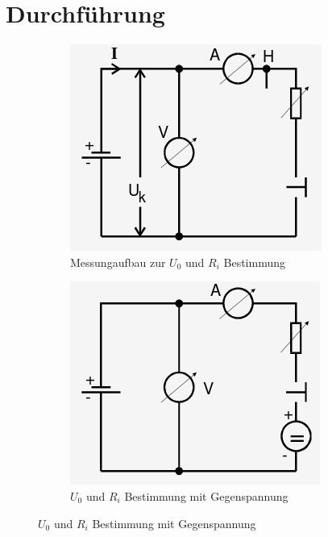 \section{Durchführung}
\label{sec:Durchführung}

\renewcommand{\labelenumi}{\alph{enumi})}
\begin{enumerate}


\begin{figure}[H]
    \centering
    \begin{subfigure}{0.48\textwidth}
      \centering
      \includegraphics[width=\linewidth-60pt,height=\textheight-60pt,keepaspectratio]{content/Spannungsquelle2.png}
      \caption{{\footnotesize Messungaufbau zur $U_0$ und $R_i$ Bestimmung}}
      \label{fig:Spannung2}
    \end{subfigure}
    \begin{subfigure}{0.48\textwidth}
      \centering
      \includegraphics[width=\linewidth-60pt,height=\textheight-60pt,keepaspectratio]{content/Spannungsquelle3.png}
      \caption{{\footnotesize $U_0$ und $R_i $ Bestimmung mit Gegenspannung}}
      \label{fig:Spannung3}
    \end{subfigure}
  \end{figure}



\end{enumerate}
